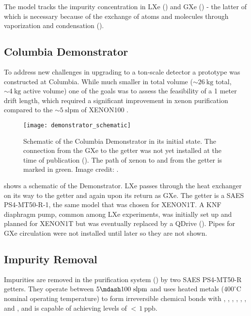 The model tracks the impurity concentration in LXe (\il) and GXe (\ig) - the latter of which is necessary because of the
exchange of atoms and molecules through vaporization and condensation ().



\subsection{Columbia Demonstrator}
\label{subsec:electron_lifetime_model_demonstrator}
To address new challenges in upgrading to a ton-scale detector a prototype was constructed at Columbia.  While much smaller in total
volume (${\sim}26\ \mathrm{kg}$ total, ${\sim}4\ \mathrm{kg}$ active volume) one of the goals was to assess the feasibility of a 1 meter
drift length, which required a significant improvement in xenon purification compared to the ${\sim}5\ \mathrm{slpm}$ of XENON100
.

\begin{figure}
\centering
\texttt{[image: demonstrator\_schematic]}
\caption{Schematic of the Columbia Demonstrator in its initial state.  The connection from the GXe to the getter was not yet installed
at the time of publication ().  The path of xenon to and from the getter is marked in
green.  Image credit: .}
\label{fig:electron_lifetime_model_demonstrator_schematic}
\end{figure}

 shows a schematic of the Demonstrator.  LXe passes through the heat exchanger
on its way to the getter and again upon its return as GXe.  The getter is a SAES PS4-MT50-R-1, the same model that was chosen for
XENON1T.  A KNF diaphragm pump, common among LXe experiments, was initially set up and planned for XENON1T but was eventually
replaced by a QDrive ().  Pipes for GXe circulation were not installed until later so they are not shown.



\subsection{Impurity Removal}
\label{subsec:electron_lifetime_model_removal}
Impurities are removed in the purification system () by two SAES PS4-MT50-R getters.  They operate between
$5 \mdash 100\ \mathrm{slpm}$ and uses heated metals ($400^{\circ}\mathrm{C}$ nominal operating temperature) to form irreversible
chemical bonds with , , , , , , and , and is capable of achieving levels of
${<}\, 1\ \mathrm{ppb}$.

